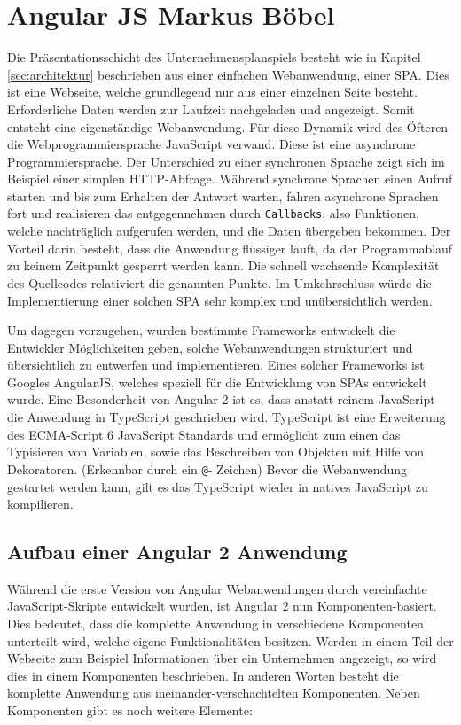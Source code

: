 \section{Angular JS \textnormal{\textsf{\small{Markus Böbel}}}}

Die Präsentationsschicht des Unternehmensplanspiels besteht wie in Kapitel \ref{sec:architektur} beschrieben aus einer einfachen Webanwendung, einer \acf{SPA}. Dies ist eine Webseite, welche grundlegend nur aus einer einzelnen Seite besteht. Erforderliche Daten werden zur Laufzeit nachgeladen und angezeigt. Somit entsteht eine eigenständige Webanwendung. Für diese Dynamik wird des Öfteren die Webprogrammiersprache JavaScript verwand. Diese ist eine asynchrone Programmiersprache. Der Unterschied zu einer synchronen Sprache zeigt sich im Beispiel einer simplen \acs{HTTP}-Abfrage. Während synchrone Sprachen einen Aufruf starten und bis zum Erhalten der Antwort warten, fahren asynchrone Sprachen fort und realisieren das entgegennehmen durch \texttt{Callbacks}, also Funktionen, welche nachträglich aufgerufen werden, und die Daten übergeben bekommen. Der Vorteil darin besteht, dass die Anwendung flüssiger läuft, da der Programmablauf zu keinem Zeitpunkt gesperrt werden kann. Die schnell wachsende Komplexität des Quellcodes relativiert die genannten Punkte. Im Umkehrschluss würde die Implementierung einer solchen \acl{SPA} sehr komplex und unübersichtlich werden. 

Um dagegen vorzugehen, wurden bestimmte Frameworks entwickelt die Entwickler Möglichkeiten geben, solche Webanwendungen strukturiert und übersichtlich zu entwerfen und implementieren. Eines solcher Frameworks ist Googles AngularJS, welches speziell für die Entwicklung von \acp{SPA} entwickelt wurde. Eine Besonderheit von Angular 2 ist es, dass anstatt reinem JavaScript die Anwendung in TypeScript geschrieben wird.
TypeScript ist eine Erweiterung des ECMA-Script 6 JavaScript Standards und ermöglicht zum einen das Typisieren von Variablen, sowie das Beschreiben von Objekten mit Hilfe von Dekoratoren. (Erkennbar durch ein \texttt{@}- Zeichen) 
Bevor die Webanwendung gestartet werden kann, gilt es das TypeScript wieder in natives JavaScript zu kompilieren.

\subsection{Aufbau einer Angular 2 Anwendung}
Während die erste Version von Angular Webanwendungen durch vereinfachte JavaScript-Skripte entwickelt wurden, ist Angular 2 nun Komponenten-basiert. 
Dies bedeutet, dass die komplette Anwendung in verschiedene Komponenten unterteilt wird, welche eigene Funktionalitäten besitzen. Werden in einem Teil der Webseite zum Beispiel Informationen über ein Unternehmen angezeigt, so wird dies in einem Komponenten beschrieben. In anderen Worten besteht die komplette Anwendung aus ineinander-verschachtelten Komponenten. Neben Komponenten gibt es noch weitere Elemente:

